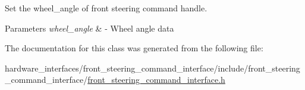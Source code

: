 Set the wheel\+\_\+angle of front steering command handle. 


\begin{DoxyParams}{Parameters}
{\em wheel\+\_\+angle} & -\/ Wheel angle data \\
\hline
\end{DoxyParams}


The documentation for this class was generated from the following file\+:\begin{DoxyCompactItemize}
\item 
hardware\+\_\+interfaces/front\+\_\+steering\+\_\+command\+\_\+interface/include/front\+\_\+steering\+\_\+command\+\_\+interface/\hyperlink{front__steering__command__interface_8h}{front\+\_\+steering\+\_\+command\+\_\+interface.\+h}\end{DoxyCompactItemize}
